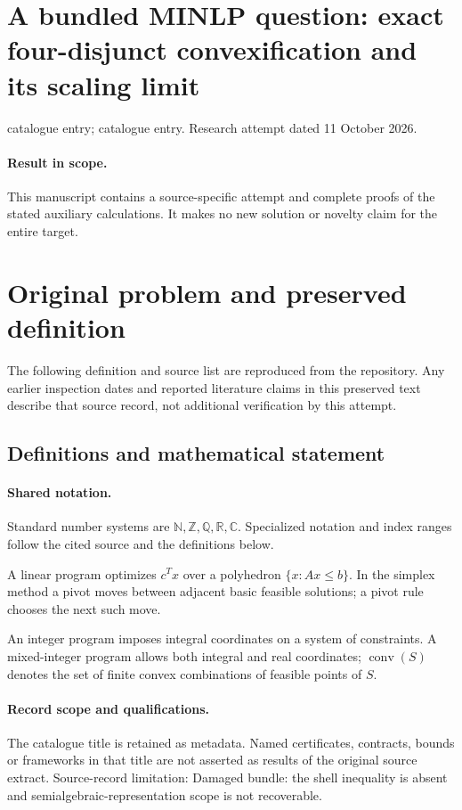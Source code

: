 \documentclass[11pt]{article}
\begin{document}
\section*{A bundled MINLP question: exact four-disjunct convexification and its scaling limit}
\noindent catalogue entry; catalogue entry. Research attempt dated 11 October 2026.
\paragraph{Result in scope.}This manuscript contains a source-specific attempt and complete proofs of the stated auxiliary calculations. It makes no new solution or novelty claim for the entire target.
\section{Original problem and preserved definition}
The following definition and source list are reproduced from the repository. Any earlier inspection dates and reported literature claims in this preserved text describe that source record, not additional verification by this attempt.
\subsection{Definitions and mathematical statement}

\paragraph{Shared notation.}Standard number systems are $\mathbb N,\mathbb Z,\mathbb Q,\mathbb R,\mathbb C$. Specialized notation and index ranges follow the cited source and the definitions below.


A linear program optimizes $c^Tx$ over a polyhedron $\{x:Ax\leq b\}$. In the simplex method a pivot moves between adjacent basic feasible solutions; a pivot rule chooses the next such move.

An integer program imposes integral coordinates on a system of constraints. A mixed-integer program allows both integral and real coordinates; $\operatorname{conv}(S)$ denotes the set of finite convex combinations of feasible points of $S$.
\paragraph{Record scope and qualifications.}
The catalogue title is retained as metadata. Named certificates, contracts, bounds or frameworks in that title are not asserted as results of the original source extract.
Source-record limitation: Damaged bundle: the shell inequality is absent and semialgebraic-representation scope is not recoverable.
\end{document}
